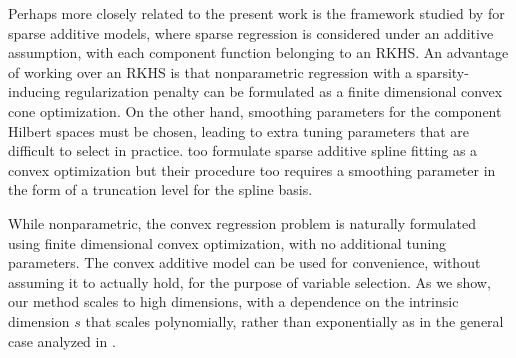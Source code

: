 Perhaps more closely related to the present work is the framework
studied by \cite{Raskutti:12} for sparse additive models, where sparse
regression is considered under an additive assumption, with each
component function belonging to an RKHS.  An advantage of working over
an RKHS is that nonparametric regression with a sparsity-inducing
regularization penalty can be formulated as a finite dimensional
convex cone optimization.  On the other hand, smoothing parameters for
the component Hilbert spaces must be chosen, leading to extra tuning
parameters that are difficult to select in practice. \cite{huang2010variable} 
too formulate sparse additive spline fitting as a convex optimization but
their procedure too requires a smoothing parameter in the form of 
a truncation level for the spline basis.

While nonparametric, the convex regression problem is naturally
formulated using finite dimensional convex optimization, with no
additional tuning parameters. The convex additive model can be used
for convenience, without assuming it to actually hold, for the purpose
of variable selection. As we show, our method scales to high
dimensions, with a dependence on the intrinsic dimension $s$ that
scales polynomially, rather than exponentially as in the general case
analyzed in \cite{dalalyan:12}. 



%
%
%
%
%
%
%
%


